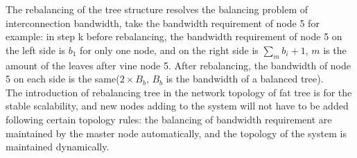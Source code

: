 \documentclass[11pt,openright,a4paper]{report}
\begin{document}
The rebalancing of the tree structure resolves the balancing problem of interconnection bandwidth, take the bandwidth requirement of node 5 for example: in step k before rebalancing, the bandwidth requirement of node 5 on the left side is $b_{1}$ for only one node, and on the right side is $\sum_{m}b_{i}+1$, $m$ is the amount of the leaves after vine node 5. After rebalancing, the bandwidth of node 5 on each side is the same($2\times B_{b}$, $B_{b}$ is the bandwidth of a balanced tree).\\ 
The introduction of rebalancing tree in the network topology of fat tree is for the stable scalability, and new nodes adding to the system will not have to be added following certain topology rules: the balancing of bandwidth requirement are maintained by the master node automatically, and the topology of the system is maintained dynamically.\\
\end{document}
